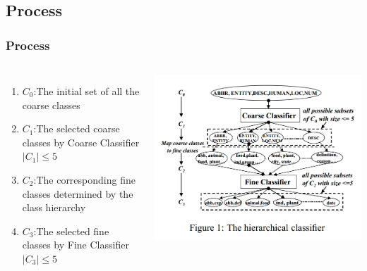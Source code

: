 \documentclass{beamer}
\begin{document}
    \subsection{Process}
    \begin{frame}
        \frametitle{Process}
        \begin{columns}[c]
            \begin{enumerate}
                \item $C_0$:The initial set of all the coarse classes
                \item $C_1$:The selected coarse classes by Coarse Classifier
                $|C_1| \leq 5$
                \item $C_2$:The corresponding fine classes determined by the class hierarchy
                \item $C_3$:The selected fine classes by Fine Classifier
                $|C_3| \leq 5$
            \end{enumerate}
            \includegraphics[scale=0.55]{2.png}
    
        \end{columns}
    \end{frame}
\end{document}
